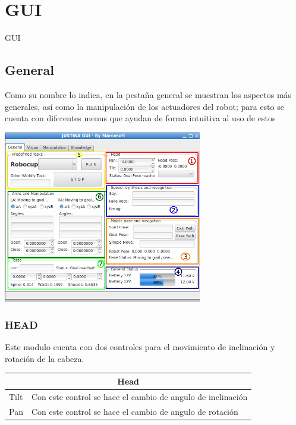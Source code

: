 \documentclass[user_manual.tex]{subfiles}
\begin{document}
\section{GUI}
GUI
\subsection{General}
Como su nombre lo indica, en la pestaña general se muestran los aspectos más generales, así como la manipulación de los actuadores del robot; para esto se cuenta con diferentes menus que ayudan de forma intuitiva al uso de estos

\begin{center}
\includegraphics[width=0.65\textwidth]{Figures/Puesta_marcha/General.png}
\end{center}

\subsubsection{HEAD}

Este modulo cuenta con dos controles para el movimiento de inclinación y rotación de la cabeza.

\begin{table}[H]
\begin{center}
\begin{tabular}{|l|l|}%

\hline
\multicolumn{2}{|c|}{Head}\\ \hline
Tilt  & Con este control se hace el cambio de angulo de inclinación \\ \hline 
Pan   & Con este control se hace el cambio de angulo de rotación\\ \hline

\end{tabular}
\end{center}
\end{table}
\end{document}
